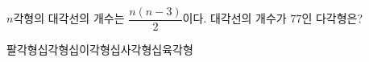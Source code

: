 $n$각형의 대각선의 개수는 $\dfrac{n(n-3)}{2}$이다. 대각선의 개수가 $77$인 다각형은?
\begin{choices32}{팔각형}{십각형}{십이각형}{십사각형}{십육각형}\end{choices32}
